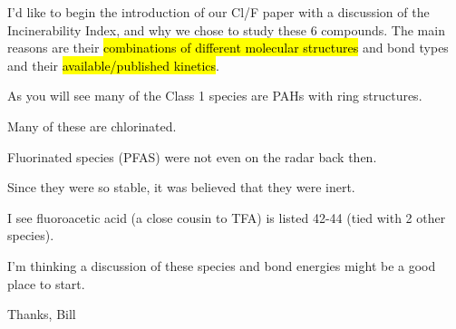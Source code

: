 \documentclass{article}
\begin{document}
I’d like to begin the introduction of our Cl/F paper with a discussion of the Incinerability Index, and why we chose to study these 6 compounds. The main reasons are their \hl{combinations of different molecular structures} and bond types and their \hl{available/published kinetics}. %

As you will see many of the Class 1 species are PAHs with ring structures.  


Many of these are chlorinated.  


Fluorinated species (PFAS) were not even on the radar back then.  


{\color{red}Since they were so stable, it was believed that they were inert.}  


I see fluoroacetic acid (a close cousin to TFA) is listed 42-44 (tied with 2 other species).  

I’m thinking a discussion of these species and bond energies might be a good place to start.

Thanks,  Bill 
\end{document}
